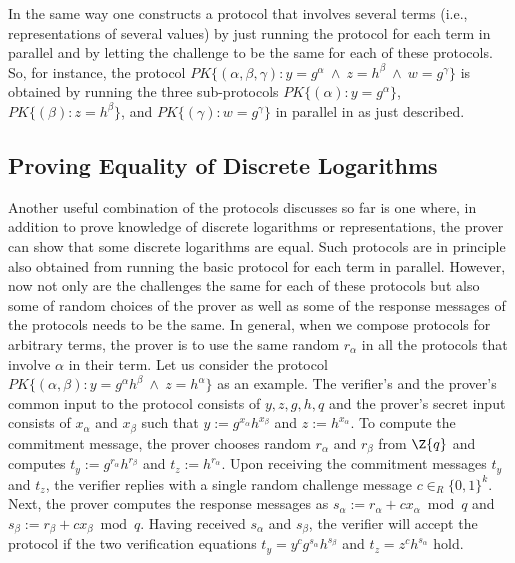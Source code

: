 In the same way one constructs a protocol that involves several terms (i.e., representations
of several values)
by just running the protocol for each term in parallel and by letting the 
challenge to be the same for each of these protocols.
So, for instance, the protocol
$\textit{PK}\{(\alpha, \beta, \gamma ): y = g^{\alpha} 
\ \wedge \ z =  h^\beta \ \wedge \ w = g^\gamma \}$
is obtained by running the three sub-protocols
$\textit{PK}\{(\alpha): y = g^{\alpha}  \}$,
$\textit{PK}\{( \beta ): z =  h^\beta  \}$, 
and 
$\textit{PK}\{(\gamma ):  w = g^\gamma \}$
in parallel in as just described.

\subsection{Proving Equality of Discrete Logarithms}
\label{Proving Equality of Discrete Logarithms}



Another useful combination of the protocols discusses so far is one where,
 in addition to prove knowledge of discrete logarithms or representations, 
the prover can show that
some discrete logarithms are equal.
Such protocols are in principle also obtained from running the 
basic protocol for each term in parallel.
However, now not only are the challenges the same for each of these
protocols but also some of random choices of the prover as well as some 
of the response messages of the protocols needs to be the same.
In general, when we compose protocols for arbitrary terms,
the prover is to use the same random $r_\alpha$ in all the protocols
that involve $\alpha$ in their term.
Let us consider the protocol 
$\textit{PK}\{(\alpha,\beta): y = g^{\alpha} h^\beta \ \wedge \ z =  h^\alpha \}$
as an example.
The verifier's and the prover's common input to the protocol consists
of $y,z,g,h,q$ and the prover's secret input consists of
$x_\alpha$ and $x_\beta$ such that 
$y := g^{x_\alpha} h^{x_\beta}$ and  $z :=  h^{x_\alpha}$.
To compute the commitment message, the prover chooses  random
$r_\alpha$ and $r_\beta$ from $\Z{q}$ and computes
$t_y := g^{r_\alpha} h^{r_\beta}$ and
$t_z := h^{r_\alpha}$.
Upon receiving the commitment messages $t_y$ and $t_z$, the verifier 
replies with a single  random challenge message $c \in_R \{0,1\}^k$. 
Next, the prover computes the response messages as
$s_\alpha := r_\alpha + c x_\alpha \bmod{q}$
and
$s_\beta := r_\beta + c x_\beta \bmod{q}$.
Having received $s_\alpha$ and $s_\beta$, the 
verifier will accept the protocol if 
the two verification equations
$t_y = y^c g^{s_\alpha} h^{s_\beta} $
and 
$t_z =  z^c h^{s_\alpha}$
hold.

